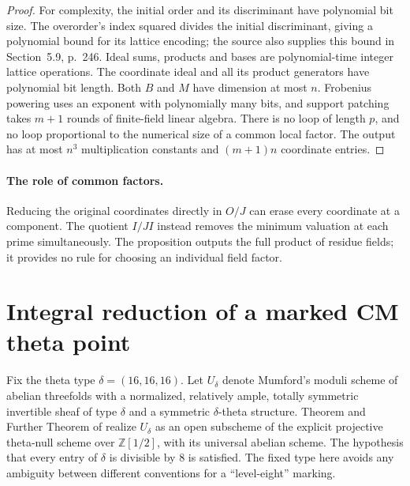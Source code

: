 \documentclass[11pt]{article}
\theoremstyle{definition}
\theoremstyle{remark}
\begin{document}
\begin{proof}
For complexity, the initial order and its discriminant have
polynomial bit size. The overorder's index squared divides the
initial discriminant, giving a polynomial bound for its lattice
encoding; the source also supplies this bound in Section~5.9,
p.~246. Ideal sums, products and bases are polynomial-time
integer lattice operations. The coordinate ideal and all its
product generators have polynomial bit length. Both \(B\) and
\(M\) have dimension at most \(n\). Frobenius powering uses an
exponent with polynomially many bits, and support patching takes
\(m+1\) rounds of finite-field linear algebra. There is no loop
of length \(p\), and no loop proportional to the numerical size
of a common local factor. The output has at most \(n^3\)
multiplication constants and \((m+1)n\) coordinate entries.
\end{proof}

\paragraph{The role of common factors.}
Reducing the original coordinates directly in \(O/J\) can erase
every coordinate at a component. The quotient \(I/JI\) instead
removes the minimum valuation at each prime simultaneously.
The proposition outputs the full product of residue fields; it
provides no rule for choosing an individual field factor.

\section{Integral reduction of a marked CM theta point}
\label{sec:kummer-cm-theta-reduction}

Fix the theta type \(\delta=(16,16,16)\).  Let
\(U_\delta\) denote Mumford's moduli scheme of abelian threefolds
with a normalized, relatively ample, totally symmetric invertible
sheaf of type \(\delta\) and a symmetric \(\delta\)-theta
structure.  Theorem and Further Theorem of
\citet[Section~6, pp.~83--84]{Mumford1967} realize
\(U_\delta\) as an open subscheme of the explicit projective
theta-null scheme over \(\mathbb Z[1/2]\), with its universal
abelian scheme.  The hypothesis that every entry of \(\delta\)
is divisible by \(8\) is satisfied.  The fixed type here avoids
any ambiguity between different conventions for a ``level-eight''
marking.
\end{document}

